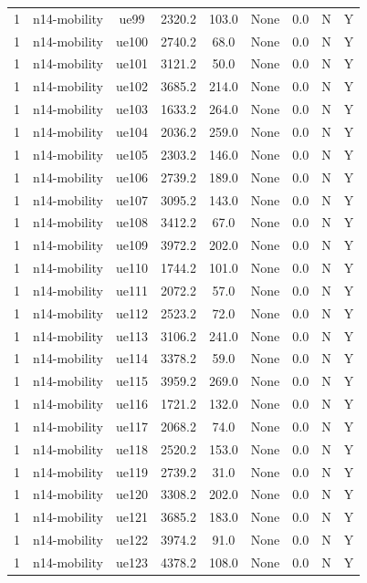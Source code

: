 \begin{table}[ht]
\begin{tabular}{|c|c|c|c|c|c|c|c|c|}
1 & n14-mobility & ue99 & 2320.2 & 103.0 & None & 0.0 & N & Y \\
1 & n14-mobility & ue100 & 2740.2 & 68.0 & None & 0.0 & N & Y \\
1 & n14-mobility & ue101 & 3121.2 & 50.0 & None & 0.0 & N & Y \\
1 & n14-mobility & ue102 & 3685.2 & 214.0 & None & 0.0 & N & Y \\
1 & n14-mobility & ue103 & 1633.2 & 264.0 & None & 0.0 & N & Y \\
1 & n14-mobility & ue104 & 2036.2 & 259.0 & None & 0.0 & N & Y \\
1 & n14-mobility & ue105 & 2303.2 & 146.0 & None & 0.0 & N & Y \\
1 & n14-mobility & ue106 & 2739.2 & 189.0 & None & 0.0 & N & Y \\
1 & n14-mobility & ue107 & 3095.2 & 143.0 & None & 0.0 & N & Y \\
1 & n14-mobility & ue108 & 3412.2 & 67.0 & None & 0.0 & N & Y \\
1 & n14-mobility & ue109 & 3972.2 & 202.0 & None & 0.0 & N & Y \\
1 & n14-mobility & ue110 & 1744.2 & 101.0 & None & 0.0 & N & Y \\
1 & n14-mobility & ue111 & 2072.2 & 57.0 & None & 0.0 & N & Y \\
1 & n14-mobility & ue112 & 2523.2 & 72.0 & None & 0.0 & N & Y \\
1 & n14-mobility & ue113 & 3106.2 & 241.0 & None & 0.0 & N & Y \\
1 & n14-mobility & ue114 & 3378.2 & 59.0 & None & 0.0 & N & Y \\
1 & n14-mobility & ue115 & 3959.2 & 269.0 & None & 0.0 & N & Y \\
1 & n14-mobility & ue116 & 1721.2 & 132.0 & None & 0.0 & N & Y \\
1 & n14-mobility & ue117 & 2068.2 & 74.0 & None & 0.0 & N & Y \\
1 & n14-mobility & ue118 & 2520.2 & 153.0 & None & 0.0 & N & Y \\
1 & n14-mobility & ue119 & 2739.2 & 31.0 & None & 0.0 & N & Y \\
1 & n14-mobility & ue120 & 3308.2 & 202.0 & None & 0.0 & N & Y \\
1 & n14-mobility & ue121 & 3685.2 & 183.0 & None & 0.0 & N & Y \\
1 & n14-mobility & ue122 & 3974.2 & 91.0 & None & 0.0 & N & Y \\
1 & n14-mobility & ue123 & 4378.2 & 108.0 & None & 0.0 & N & Y \\

\end{tabular}
\end{table}
